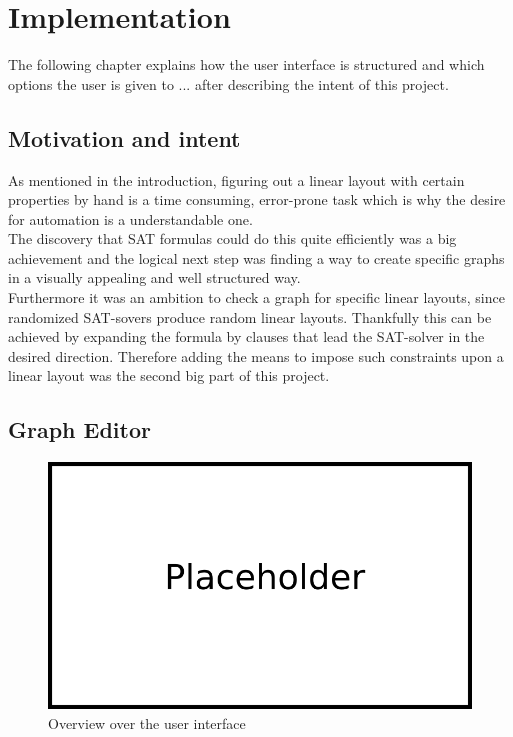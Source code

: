 
\chapter{Implementation}
  \label{Implementation}
The following chapter explains how the user interface is structured and which options the user is given to ... after describing the intent of this project.
\section{Motivation and intent}
As mentioned in the introduction, figuring out a linear layout with certain properties by hand is a time consuming, error-prone task which is why the desire for automation is a understandable one.\\
The discovery that SAT formulas could do this quite efficiently\cite{Bekos2015TheBE} was a big achievement and the logical next step was finding a way to create specific graphs in a visually appealing and well structured way. \\
Furthermore it was an ambition to check a graph for specific linear layouts, since randomized SAT-sovers produce random linear layouts. Thankfully this  can be achieved by expanding the formula by clauses that lead the SAT-solver in the desired direction. Therefore adding the means to impose such constraints upon a linear layout was the second big part of this project.
\section{Graph Editor}
\begin{figure}[!h]
\begin{center}
\includegraphics[width=1\textwidth]{figures/Platzhalter.png}
\caption{Overview over the user interface}
\label{img:overviewIndex}
\end{center}
\end{figure}
